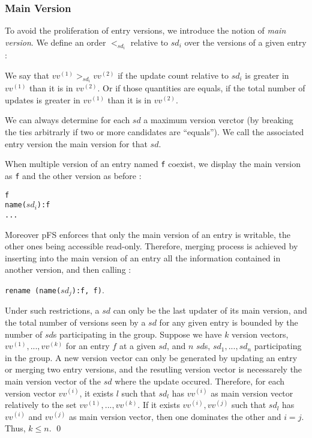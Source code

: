 \subsubsection{Main Version}

To avoid the proliferation of entry versions, we introduce the notion
of \emph{main version}. We define an order $<_{sd_{i}}$ relative to
$sd_{i}$ over the versions of a given entry :

\begin{definition}
We say that $vv^{(1)} >_{sd_{i}} vv^{(2)}$ if the update count
relative to $sd_{i}$ is greater in $vv^{(1)}$ than it is in
$vv^{(2)}$. Or if those quantities are equals, if the total number
of updates is greater in $vv^{(1)}$ than it is in $vv^{(2)}$.
\end{definition}
 
We can always determine for each $sd$ a maximum version verctor (by
breaking the ties arbitrarly if two or more candidates are
``equals''). We call the associated entry version the main version for
that $sd$.

When multiple version of an entry named {\tt f} coexist, we display
the main version as {\tt f} and the other version as before :
\begin{center}
  {\tt f} \\
  {\tt name($sd_{i}$):f} \\
  {\tt ...}
\end{center}
Moreover pFS enforces that only the main version of an entry is
writable, the other ones being accessible read-only.
Therefore, merging process is achieved by inserting into the main
version of an entry all the information contained in another version,
and then calling :
\begin{center}
{\tt rename (name($sd_{j}$):f, f)}.
\end{center}
Under such restrictions, a $sd$ can only be the last updater of its
main version, and the total number of versions seen by a $sd$ for any
given entry is bounded by the number of $sd$s participating in the group.
{\proof
Suppose we have $k$ version vectors, $vv^{(1)},..., vv^{(k)}$ for an
entry $f$ at a given $sd$, and $n$ $sd$s, $sd_{1}, ..., sd_{n}$
participating in the group. A new version vector can only be generated
by updating an entry or merging two entry versions, and the resutling
version vector is necessarely the main version vector of the $sd$
where the update occured. Therefore, for each version vector
$vv^{(i)}$, it exists $l$ such that $sd_{l}$ has $vv^{(i)}$ as main
version vector relatively to the set $vv^{(1)},..., vv^{(k)}$. If it
exists $vv^{(i)},vv^{(j)}$ such that $sd_{l}$ has $vv^{(i)}$ and
$vv^{(j)}$ as main version vector, then one dominates the other and
$i=j$. Thus, $k \leq n$. \qed
}

